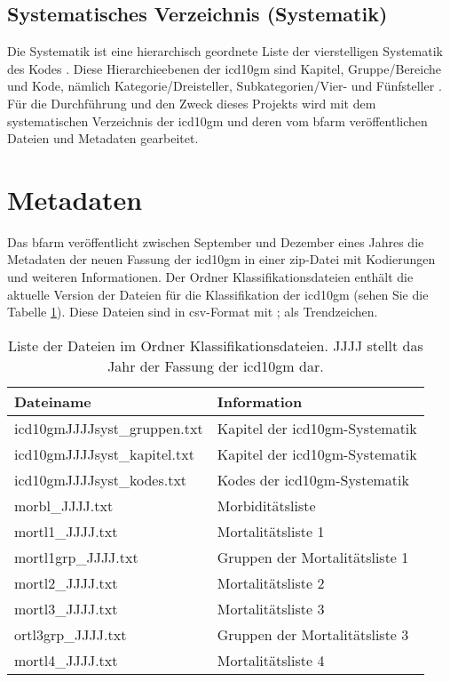 \subsection{Systematisches Verzeichnis (Systematik)} 

Die Systematik ist eine hierarchisch geordnete Liste der vierstelligen Systematik des Kodes \cite{icd10syst}. Diese Hierarchieebenen der \ac{icd10gm} sind Kapitel, Gruppe/Bereiche und Kode, nämlich Kategorie/Dreisteller, Subkategorien/Vier- und Fünfsteller \cite{icd10systauf}. Für die Durchführung und den Zweck dieses Projekts wird mit dem systematischen Verzeichnis der \ac{icd10gm} und deren vom \ac{bfarm} veröffentlichen Dateien und Metadaten gearbeitet. 
\section{Metadaten}

Das \ac{bfarm} veröffentlicht zwischen September und Dezember eines Jahres die Metadaten der neuen Fassung der \ac{icd10gm} in einer \ac{zip}-Datei mit Kodierungen und weiteren Informationen. Der Ordner Klassifikationsdateien enthält die aktuelle Version der Dateien für die Klassifikation der \ac{icd10gm} (sehen Sie die Tabelle \ref{tab:classfiles}). Diese Dateien sind in \ac{csv}-Format mit \glqq ;\grqq{} als Trendzeichen. 

\begin{table}[ht]
	\centering
	\small
	\caption[Inhalt im Ordner Klassifikationsdateien ]{Liste der Dateien im Ordner Klassifikationsdateien. \glqq JJJJ\grqq{} stellt das Jahr der Fassung der \ac{icd10gm} dar.}
	\label{tab:classfiles}
	\begin{tabular}{|l|l|}
		\hline
		\rowcolor{lightgray} Dateiname & Information \\
		\hline 
		\textsf{icd10gmJJJJsyst\_gruppen.txt} &  Kapitel der \ac{icd10gm}-Systematik \\ \hline
		\textsf{icd10gmJJJJsyst\_kapitel.txt} & Kapitel der \ac{icd10gm}-Systematik \\ \hline
		\textsf{icd10gmJJJJsyst\_kodes.txt} & Kodes der \ac{icd10gm}-Systematik \\ \hline
		\textsf{morbl\_JJJJ.txt} & Morbiditätsliste  \\ \hline
		\textsf{mortl1\_JJJJ.txt} & Mortalitätsliste 1 \\ \hline
		\textsf{mortl1grp\_JJJJ.txt} & Gruppen der Mortalitätsliste 1 \\ \hline
		\textsf{mortl2\_JJJJ.txt} & Mortalitätsliste 2 \\ \hline
		\textsf{mortl3\_JJJJ.txt} & Mortalitätsliste 3 \\ \hline
		\textsf{ortl3grp\_JJJJ.txt} & Gruppen der Mortalitätsliste 3 \\ \hline
		\textsf{mortl4\_JJJJ.txt} & Mortalitätsliste 4 \\ \hline		
	\end{tabular}
\end{table}

